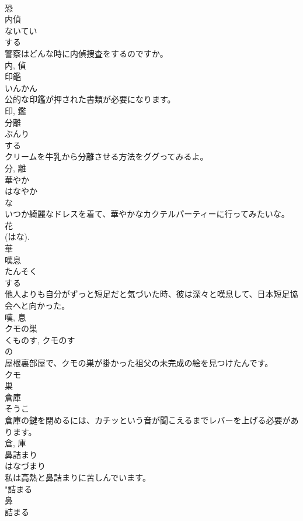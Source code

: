 \documentclass[8pt]{extreport}
\begin{document}
\begin{CJK}{UTF8}{min}
\\	恐	
\\	内偵	
\\	ないてい	
\\	する 
\\	警察はどんな時に内偵捜査をするのですか。	
\\	内, 偵	
\\	印鑑	
\\	いんかん	
\\	公的な印鑑が押された書類が必要になります。	
\\	印, 鑑	
\\	分離	
\\	ぶんり	
\\	する 
\\	クリームを牛乳から分離させる方法をググってみるよ。	
\\	分, 離	
\\	華やか	
\\	はなやか	
\\	な 
\\	いつか綺麗なドレスを着て、華やかなカクテルパーティーに行ってみたいな。	
\\	花
\\	(はな). 
\\	華	
\\	嘆息	
\\	たんそく	
\\	する 
\\	他人よりも自分がずっと短足だと気づいた時、彼は深々と嘆息して、日本短足協会へと向かった。	
\\	嘆, 息	
\\	クモの巣	
\\	くものす, クモのす	
\\	の 
\\	屋根裏部屋で、クモの巣が掛かった祖父の未完成の絵を見つけたんです。	
\\	クモ 
\\	巣	
\\	倉庫	
\\	そうこ	
\\	倉庫の鍵を閉めるには、カチッという音が聞こえるまでレバーを上げる必要があります。	
\\	倉, 庫	
\\	鼻詰まり	
\\	はなづまり	
\\	私は高熱と鼻詰まりに苦しんでいます。	
\\	"詰まる 
\\	鼻 
\\	詰まる 

\end{CJK}
\end{document}

